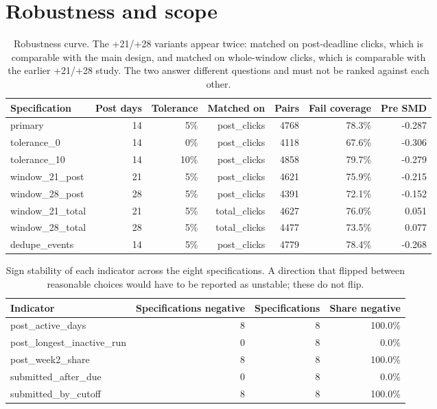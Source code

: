 \documentclass[11pt]{article}
\begin{document}
\section{Robustness and scope}
\begin{table}[t]
\centering
\scriptsize\setlength{\tabcolsep}{3pt}
\begin{tabular}{lrrrrrr}
\toprule
Specification & Post days & Tolerance & Matched on & Pairs & Fail coverage & Pre SMD \\
\midrule
primary & 14 & 5\% & post\_clicks & 4768 & 78.3\% & -0.287 \\
tolerance\_0 & 14 & 0\% & post\_clicks & 4118 & 67.6\% & -0.306 \\
tolerance\_10 & 14 & 10\% & post\_clicks & 4858 & 79.7\% & -0.279 \\
window\_21\_post & 21 & 5\% & post\_clicks & 4621 & 75.9\% & -0.215 \\
window\_28\_post & 28 & 5\% & post\_clicks & 4391 & 72.1\% & -0.152 \\
window\_21\_total & 21 & 5\% & total\_clicks & 4627 & 76.0\% & 0.051 \\
window\_28\_total & 28 & 5\% & total\_clicks & 4477 & 73.5\% & 0.077 \\
dedupe\_events & 14 & 5\% & post\_clicks & 4779 & 78.4\% & -0.268 \\
\bottomrule
\end{tabular}
\caption{Robustness curve. The +21/+28 variants appear twice: matched on post-deadline clicks, which is comparable with the main design, and matched on whole-window clicks, which is comparable with the earlier +21/+28 study. The two answer different questions and must not be ranked against each other.}
\label{tab:specs}
\end{table}
\begin{table}[t]
\centering
\footnotesize
\begin{tabular}{lrrr}
\toprule
Indicator & Specifications negative & Specifications & Share negative \\
\midrule
post\_active\_days & 8 & 8 & 100.0\% \\
post\_longest\_inactive\_run & 0 & 8 & 0.0\% \\
post\_week2\_share & 8 & 8 & 100.0\% \\
submitted\_after\_due & 0 & 8 & 0.0\% \\
submitted\_by\_cutoff & 8 & 8 & 100.0\% \\
\bottomrule
\end{tabular}
\caption{Sign stability of each indicator across the eight specifications. A direction that flipped between reasonable choices would have to be reported as unstable; these do not flip.}
\label{tab:direction}
\end{table}
\end{document}
